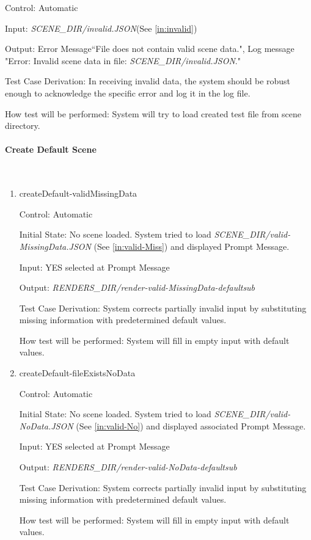 \documentclass[12pt, titlepage]{article}
\begin{document}
\begin{enumerate}
Control: Automatic

Input: \textit{SCENE\_DIR/invalid.JSON}(See \ref{in:invalid})

Output: Error Message``File does not contain valid scene data.", Log message 
"Error: Invalid scene data in file: \textit{SCENE\_DIR/invalid.JSON}."

Test Case Derivation: In receiving invalid data, the system should be robust 
enough to acknowledge the specific error and log it in the log file.

How test will be performed: System will try to load created test file from 
scene directory.

\end{enumerate}

\paragraph{Create Default Scene}
~\newline
\begin{enumerate}
	
	\item{createDefault-validMissingData\\}
	
	Control: Automatic

	Initial State: No scene loaded.	System tried to load 
	\textit{SCENE\_DIR/valid-MissingData.JSON} (See \ref{in:valid-Miss}) and 
	displayed Prompt Message.

	Input: YES selected at Prompt Message
	
	Output: \textit{RENDERS\_DIR/render-valid-MissingData-defaultsub}
	
	Test Case Derivation: System corrects partially invalid input by 
	substituting missing information with predetermined default values.
	
	How test will be performed: System will fill in empty input with default 
	values.
	
	\item{createDefault-fileExistsNoData\\}
	
	Control: Automatic
	
	Initial State: No scene loaded.	System tried to load 
	\textit{SCENE\_DIR/valid-NoData.JSON} (See \ref{in:valid-No}) and displayed 
	associated Prompt 
	Message.
	
	Input: YES selected at Prompt Message
	
	Output: \textit{RENDERS\_DIR/render-valid-NoData-defaultsub}
	
	Test Case Derivation: System corrects partially invalid input by 
	substituting missing information with predetermined default values.
	
	How test will be performed: System will fill in empty input with default 
	values.	
	
\end{enumerate}
\end{document}

